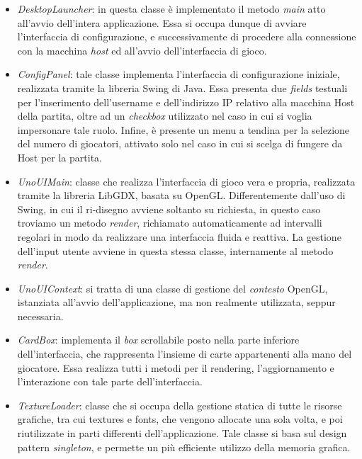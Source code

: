 \documentclass[11pt]{article} %
\begin{document}
\begin{itemize}
	\item \emph{DesktopLauncher}: in questa classe è implementato il metodo \textit{main} atto all'avvio dell'intera applicazione. Essa si occupa dunque di avviare l'interfaccia di configurazione, e successivamente di procedere alla connessione con la macchina \textit{host} ed all'avvio dell'interfaccia di gioco.
	\item \emph{ConfigPanel}: tale classe implementa l'interfaccia di configurazione iniziale, realizzata tramite la libreria Swing di Java. Essa presenta due \textit{fields} testuali per l'inserimento dell'username e dell'indirizzo IP relativo alla macchina Host della partita, oltre ad un \textit{checkbox} utilizzato nel caso in cui si voglia impersonare tale ruolo. Infine, è presente un menu a tendina per la selezione del numero di giocatori, attivato solo nel caso in cui si scelga di fungere da Host per la partita.
	\item \emph{UnoUIMain}: classe che realizza l'interfaccia di gioco vera e propria, realizzata tramite la libreria LibGDX, basata su OpenGL. Differentemente dall'uso di Swing, in cui il ri-disegno avviene soltanto su richiesta, in questo caso troviamo un metodo \textit{render}, richiamato automaticamente ad intervalli regolari in modo da realizzare una interfaccia fluida e reattiva. La gestione dell'input utente avviene in questa stessa classe, internamente al metodo \textit{render}.
	\item \emph{UnoUIContext}: si tratta di una classe di gestione del \textit{contesto} OpenGL, istanziata all'avvio dell'applicazione, ma non realmente utilizzata, seppur necessaria.
	\item \emph{CardBox}: implementa il \textit{box} scrollabile posto nella parte inferiore dell'interfaccia, che rappresenta l'insieme di carte appartenenti alla mano del giocatore. Essa realizza tutti i metodi per il rendering, l'aggiornamento e l'interazione con tale parte dell'interfaccia.
	\item \emph{TextureLoader}: classe che si occupa della gestione statica di tutte le risorse grafiche, tra cui textures e fonts, che vengono allocate una sola volta, e poi riutilizzate in parti differenti dell'applicazione. Tale classe si basa sul design pattern \textit{singleton}, e permette un più efficiente utilizzo della memoria grafica. 
\end{itemize}
\end{document}
